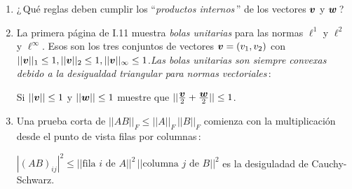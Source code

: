 \documentclass[12pt,a4paper]{article}
\newcommand{\bi}[1]{\hbox{\boldmath$#1$}}
\newcommand\1{\mbox{\,\vrule height-0.8pt depth1.0pt width2pc\,}}
\newcommand\2{\mbox{\,\vrule height-0.8pt depth1.0pt width1pc\,}}
\DeclareRobustCommand\transp{^{\mathrm{T}}}
\newcommand{\bv}{\hbox{\boldmath$v$}}
\newcommand{\bw}{\hbox{\boldmath$w$}}
\begin{document}
\begin{enumerate}
\vspace{-16pt}
$$
\index[authors]{H\"{o}lder}\index[indx]{Desigualdad de H\"{o}lder}\textbf{Desigualdad de H\"{o}lder}\qquad |\bv\transp\bw|\leq||\bv||_{\text{\footnotesize $\bi{p}$}}\,||\bw||_{\text{\footnotesize $\bi{q}$}} \text{ \;cuando\; } \bi{\frac1p+\frac1q=1}.
$$

¿\,Cómo se interpreta la desigualdad en el caso en que $p=1$ y $q=\infty$\,?
\item ¿\,Qué reglas deben cumplir los ``\emph{productos internos}\,'' de los vectores $\bv$ y $\bw$\,?
\item La primera página de\; I.11 muestra \emph{bolas unitarias} para las normas $\ell^1$ y $\ell^2$ y $\ell^\infty$. Esos son los tres conjuntos de vectores $\bv=(v_1,v_2)$ con $||\bv||_1\leq 1, ||\bv||_2\leq 1, ||\bv||_\infty\leq 1$.\linebreak \emph{Las bolas unitarias son siempre convexas debido a la desigualdad triangular para normas vectoriales}\,:

\vspace{-7pt}
\begin{center}
Si $||\bv||\leq 1$ y $||\bw||\leq1$ muestre que $||\frac{\bv}{2}+\frac{\bw}{2}||\leq 1$.
\end{center}
\item Una prueba corta de $||AB||_F\leq||A||_F\,||B||_F$ comienza con la multiplicación desde el punto de vista filas por columnas\,:

\vspace{5pt}
\hspace{10pt}
$|(AB)_{ij}|^2\leq||\text{fila }i\text{ de }A||^2\,||\text{columna } j\text{ de } B||^2$ es la desiguladad de Cauchy-Schwarz.


\end{enumerate}
\end{document}
